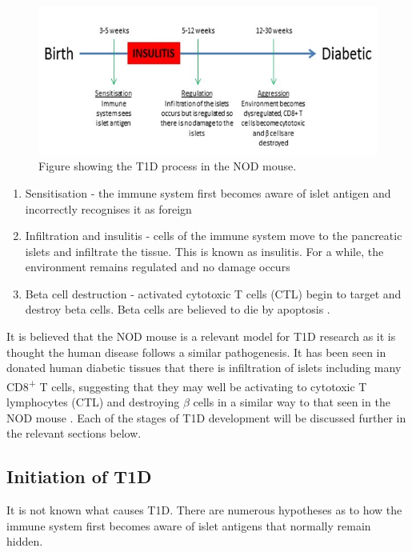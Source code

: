 \begin{figure}
\includegraphics[width=\textwidth]{Figures/Diseasecourse.png}
\caption{Figure showing the T1D process in the NOD mouse.}
\label{fig:diseasecourse}
\end{figure}

\begin{enumerate}
\item Sensitisation - the immune system first becomes aware of islet antigen and incorrectly recognises it as foreign
\item Infiltration and insulitis - cells of the immune system move to the pancreatic islets and infiltrate the tissue. This is known as insulitis. For a while, the environment remains regulated and no damage occurs
\item Beta cell destruction - activated cytotoxic T cells (CTL) begin to target and destroy beta cells. Beta cells are believed to die by apoptosis \citep{Cnop2005}.
\end{enumerate}

It is believed that the NOD mouse is a relevant model for T1D research as it is thought the human disease follows a similar pathogenesis.
It has been seen in donated human diabetic tissues that there is infiltration of islets including many CD8\textsuperscript{+} T cells, suggesting that they may well be activating to cytotoxic T lymphocytes (CTL) and destroying $\beta$ cells in a similar way to that seen in the NOD mouse \citep{Hanafusa2008}.
Each of the stages of T1D development will be discussed further in the relevant sections below.


\subsection{Initiation of T1D}

It is not known what causes T1D.
There are numerous hypotheses as to how the immune system first becomes aware of islet antigens that normally remain hidden.


